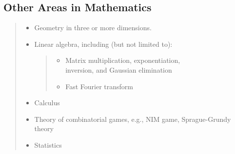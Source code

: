 \documentclass[a4paper,11pt,oneside]{article}
\newcommand{\xmark}{\ding{55}}%
\newcommand{\cexcl}{{\small\xmark}}
\newcommand{\Iexcluded}{\item[\hbox to 1.8em{\cexcl\hfill}]}
\newenvironment{myitemize}{\begin{quote}\begin{itemize}\itemsep 0pt}{\end{itemize}\end{quote}}
\begin{document}
\subsection {Other Areas in Mathematics}%
\label{subsubsec:other-mathematics}

    \begin{myitemize}
    \Iexcluded Geometry in three or more dimensions.
    \Iexcluded  Linear algebra, including (but not limited to):
        \begin{myitemize}
        \item Matrix multiplication, exponentiation, \\
              inversion, and Gaussian elimination
        \item Fast Fourier transform
        \end{myitemize}
    \Iexcluded Calculus
    \Iexcluded Theory of combinatorial games, e.g., NIM game, Sprague-Grundy theory
    \Iexcluded Statistics
    \end{myitemize}

\end{document}
